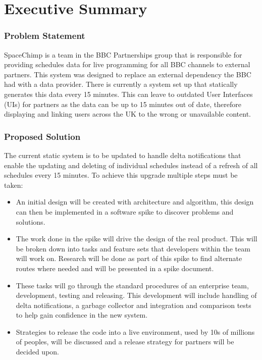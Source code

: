 \section{Executive Summary}

\subsubsection*{Problem Statement}
SpaceChimp is a team in the BBC Partnerships group that is responsible for providing schedules data for live programming for all BBC channels to 
external partners. This system was designed to replace an external dependency the BBC had with a data provider. There is currently a system set up 
that statically generates this data every 15 minutes. This can leave to outdated User Interfaces (UIs) for partners as the data can be up to 15 minutes 
out of date, therefore displaying and linking users across the UK to the wrong or unavailable content.

\subsubsection*{Proposed Solution}
The current static system is to be updated to handle delta notifications that enable the updating and deleting of individual schedules instead of a 
refresh of all schedules every 15 minutes. To achieve this upgrade multiple steps must be taken:

\begin{itemize}
  \item An initial design will be created with architecture and algorithm, this design can then be implemented in a software spike to discover 
  problems and solutions.
  \item The work done in the spike will drive the design of the real product. This will be broken down into tasks and feature sets that developers 
  within the team will work on. Research will be done as part of this spike to find alternate routes where needed and will be presented in a spike 
  document.
  \item These tasks will go through the standard procedures of an enterprise team, development, testing and releasing. This development will include 
  handling of delta notifications, a garbage collector and integration and comparison tests to help gain confidence in the new system.
  \item Strategies to release the code into a live environment, used by 10s of millions of peoples, will be discussed and a release strategy for partners 
  will be decided upon.
\end{itemize}

